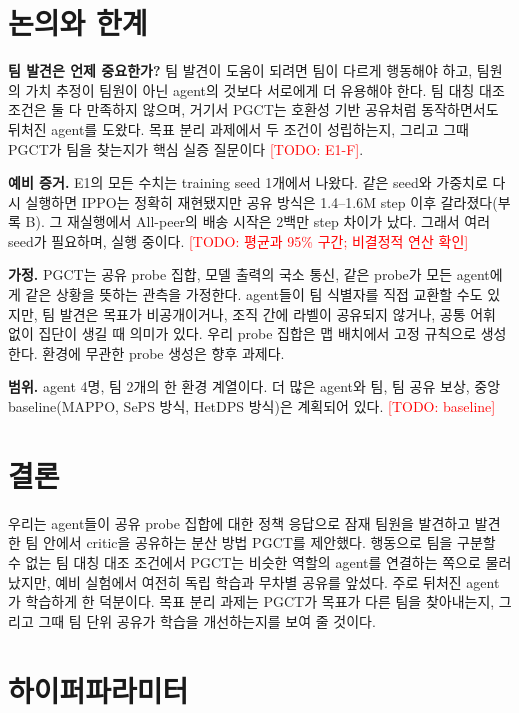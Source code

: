 \documentclass[twocolumn,10pt]{article}
\newcommand{\todo}[1]{\textcolor{red}{[TODO: #1]}}
\newcommand{\ours}{PGCT}
\begin{document}
\section{논의와 한계}
\textbf{팀 발견은 언제 중요한가?} 팀 발견이 도움이 되려면 팀이 다르게 행동해야 하고, 팀원의 가치 추정이 팀원이 아닌 agent의 것보다 서로에게 더 유용해야 한다. 팀 대칭 대조
조건은 둘 다 만족하지 않으며, 거기서 \ours{}는 호환성 기반 공유처럼 동작하면서도 뒤처진 agent를 도왔다. 목표 분리 과제에서 두 조건이 성립하는지, 그리고 그때 \ours{}가 팀을
찾는지가 핵심 실증 질문이다 \todo{E1-F}.

\textbf{예비 증거.} E1의 모든 수치는 training seed 1개에서 나왔다. 같은 seed와 가중치로 다시 실행하면 IPPO는 정확히 재현됐지만 공유 방식은 1.4--1.6M step 이후 갈라졌다(부록 B).
그 재실행에서 All-peer의 배송 시작은 2백만 step 차이가 났다. 그래서 여러 seed가 필요하며, 실행 중이다. \todo{평균과 95\% 구간; 비결정적 연산 확인}

\textbf{가정.} \ours{}는 공유 probe 집합, 모델 출력의 국소 통신, 같은 probe가 모든 agent에게 같은 상황을 뜻하는 관측을 가정한다. agent들이 팀 식별자를 직접 교환할 수도 있지만,
팀 발견은 목표가 비공개이거나, 조직 간에 라벨이 공유되지 않거나, 공통 어휘 없이 집단이 생길 때 의미가 있다. 우리 probe 집합은 맵 배치에서 고정 규칙으로 생성한다. 환경에 무관한
probe 생성은 향후 과제다.

\textbf{범위.} agent 4명, 팀 2개의 한 환경 계열이다. 더 많은 agent와 팀, 팀 공유 보상, 중앙 baseline(MAPPO, SePS 방식, HetDPS 방식)은 계획되어 있다. \todo{baseline}

\section{결론}
우리는 agent들이 공유 probe 집합에 대한 정책 응답으로 잠재 팀원을 발견하고 발견한 팀 안에서 critic을 공유하는 분산 방법 \ours{}를 제안했다. 행동으로 팀을 구분할 수 없는 팀 대칭
대조 조건에서 \ours{}는 비슷한 역할의 agent를 연결하는 쪽으로 물러났지만, 예비 실험에서 여전히 독립 학습과 무차별 공유를 앞섰다. 주로 뒤처진 agent가 학습하게 한 덕분이다. 목표
분리 과제는 \ours{}가 목표가 다른 팀을 찾아내는지, 그리고 그때 팀 단위 공유가 학습을 개선하는지를 보여 줄 것이다.




\clearpage
\appendix
\onecolumn

\section{하이퍼파라미터}
\begin{table}[h]
\centering
\small

\caption{처음부터 학습한 E1 비교의 설정(donor 집합을 제외하고 모든 방법이 동일).}
\end{table}
\end{document}
